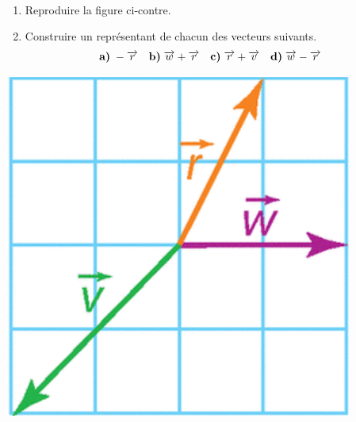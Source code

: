\documentclass[11pt]{article}
\begin{document}
\begin{exo}~\\[-4mm]
  \begin{minipage}[]{.6\textwidth}
    \begin{enumerate}
      \item Reproduire la figure ci-contre.
      \item Construire un représentant de chacun des vecteurs suivants.
        \begin{align*}
          \textbf{a)}\;& -\overrightarrow{r} & 
          \textbf{b)}\;& \overrightarrow{w}+\overrightarrow{r} & 
          \textbf{c)}\;& \overrightarrow{r}+\overrightarrow{v} & 
          \textbf{d)}\;& \overrightarrow{w}-\overrightarrow{r}
        \end{align*}
    \end{enumerate}
  \end{minipage}
  \begin{minipage}[]{.4\textwidth}
    \begin{center}
      \includegraphics[scale=.25]{3d.png}
    \end{center}
  \end{minipage}
\end{exo}
\end{document}
